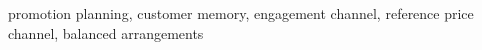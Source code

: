 promotion planning, customer memory, engagement channel, reference price channel, balanced arrangements
